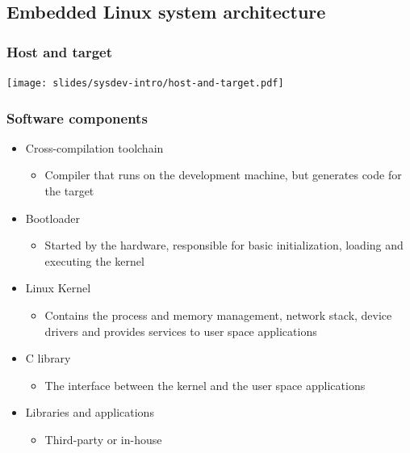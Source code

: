 \subsection{Embedded Linux system architecture}

\begin{frame}
  \frametitle{Host and target}
  \begin{center}
    \texttt{[image: slides/sysdev-intro/host-and-target.pdf]}
  \end{center}
\end{frame}

\begin{frame}
  \frametitle{Software components}
  \begin{itemize}
  \item Cross-compilation toolchain
    \begin{itemize}
    \item Compiler that runs on the development machine, but generates
      code for the target
    \end{itemize}
  \item Bootloader
    \begin{itemize}
    \item Started by the hardware, responsible for basic
      initialization, loading and executing the kernel
    \end{itemize}
  \item Linux Kernel
    \begin{itemize}
    \item Contains the process and memory management, network stack,
      device drivers and provides services to user space applications
    \end{itemize}
  \item C library
    \begin{itemize}
    \item The interface between the kernel and the user space
      applications
    \end{itemize}
  \item Libraries and applications
    \begin{itemize}
    \item Third-party or in-house
    \end{itemize}
  \end{itemize}
\end{frame}

